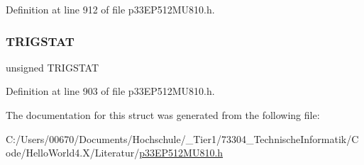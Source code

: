 Definition at line 912 of file p33\+E\+P512\+M\+U810.\+h.

\mbox{\label{structtag_i_c7_c_o_n2_b_i_t_s_ab379549de54ac93ad4aa73686c34cb7c}} 
\subsubsection{\texorpdfstring{T\+R\+I\+G\+S\+T\+AT}{TRIGSTAT}}
{\footnotesize\ttfamily unsigned T\+R\+I\+G\+S\+T\+AT}



Definition at line 903 of file p33\+E\+P512\+M\+U810.\+h.



The documentation for this struct was generated from the following file\+:\begin{DoxyCompactItemize}
\item 
C\+:/\+Users/00670/\+Documents/\+Hochschule/\+\_\+\+Tier1/73304\+\_\+\+Technische\+Informatik/\+Code/\+Hello\+World4.\+X/\+Literatur/\hyperlink{p33_e_p512_m_u810_8h}{p33\+E\+P512\+M\+U810.\+h}\end{DoxyCompactItemize}
